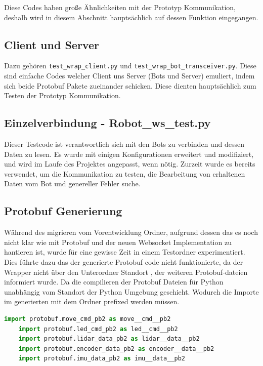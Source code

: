 Diese Codes haben große Ähnlichkeiten mit der Prototyp Kommunikation, 
deshalb wird in diesem Abschnitt hauptsächlich auf dessen Funktion eingegangen.

\subsection{Client und Server}
Dazu gehören \texttt{test\_wrap\_client.py} und \texttt{test\_wrap\_bot\_transceiver.py}.
Diese sind einfache Codes welcher Client uns Server (Bots und Server) emuliert, 
indem sich beide Protobuf Pakete zueinander schicken. 
Diese dienten hauptsächlich zum Testen der Prototyp Kommunikation.

\subsection{Einzelverbindung - Robot\_ws\_test.py}
Dieser Testcode ist verantwortlich sich mit den Bots zu verbinden und dessen Daten zu lesen.
Es wurde mit einigen Konfigurationen erweitert und modifiziert, 
und wird im Laufe des Projektes angepasst, wenn nötig.
Zurzeit wurde es bereits verwendet, um die Kommunikation zu testen, 
die Bearbeitung von erhaltenen Daten vom Bot und genereller Fehler suche.

\subsection{Protobuf Generierung}
Während des migrieren vom Vorentwicklung Ordner, 
aufgrund dessen das es noch nicht klar wie mit Protobuf 
und der neuen Websocket Implementation zu hantieren ist, 
wurde für eine gewisse Zeit in einem Testordner experimentiert.
Dies führte dazu das der generierte Protobuf code nicht funktionierte,
da der Wrapper nicht über den Unterordner Standort , 
der weiteren Protobuf-dateien informiert wurde.
Da die compilieren der Protobuf Dateien für Python unabhängig vom Standort
der Python Umgebung geschieht. 
Wodurch die Importe im generierten 
mit dem Ordner prefixed werden müssen.

\begin{lstlisting}[language=python, gobble=4]
    import protobuf.move_cmd_pb2 as move__cmd__pb2
    import protobuf.led_cmd_pb2 as led__cmd__pb2
    import protobuf.lidar_data_pb2 as lidar__data__pb2
    import protobuf.encoder_data_pb2 as encoder__data__pb2
    import protobuf.imu_data_pb2 as imu__data__pb2
\end{lstlisting}
